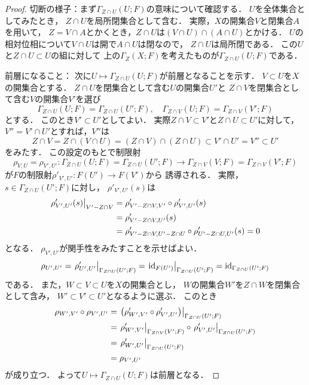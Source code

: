 \begin{proof}
    切断の様子：まず\(\Gamma_{Z\cap U}(U;F)\)の意味について確認する．
    \(U\)を全体集合としてみたとき，
    \(Z\cap U\)を局所閉集合として含む．
    実際，\(X\)の開集合\(V\)と閉集合\(A\)を用いて，
    \(Z=V\cap A\)とかくとき，\(Z\cap U\)は\(
        (V\cap U)\cap (A\cap U)
    \)とかける．
    \(U\)の相対位相について\(V\cap U\)は開で\(A\cap U\)は閉なので，
    \(Z\cap U\)は局所閉である．
    この\(U\)と\(Z\cap U\subset U\)の組に対して
    上の\(\Gamma_Z(X;F)\)を考えたものが\(
        \Gamma_{Z\cap U}(U;F)
    \)である．

    前層になること：
    次に\(U\mapsto\Gamma_{Z\cap U}(U;F)\)が前層となることを示す．
    \(V\subset U\)を\(X\)の開集合とする．
    \(Z\cap U\)を閉集合として含む\(U\)の開集合\(U'\)と
    \(Z\cap V\)を閉集合として含む\(V\)の開集合\(V'\)を選び\[
        \Gamma_{Z\cap U}(U;F)=
        \Gamma_{Z\cap U}(U';F),\quad
        \Gamma_{Z\cap V}(U;F)=
        \Gamma_{Z\cap V}(V';F)
    \]とする．
    このとき\(V'\subset U'\)としてよい．
    実際\(Z\cap V\subset V'\)と\(Z\cap U \subset U'\)に対して，
    \(V''= V'\cap U'\)とすれば，\(V''\)は\[
        Z\cap V=Z\cap (V\cap U)
        =(Z\cap V)\cap (Z\cap U)
        \subset V'\cap U'
        =V''\subset U'
    \]をみたす．
    この設定のもとで制限射\[
        \rho_{V,U}=\rho_{V',U'}\colon
        \Gamma_{Z\cap U}(U;F)
        =\Gamma_{Z\cap U}(U';F)
        \to\Gamma_{Z\cap V}(V;F)
        =\Gamma_{Z\cap V}(V';F)
    \]が\(F\)の制限射\(\rho'_{V',U'}\colon F(U')\to F(V')\)から
    誘導される．
    実際，\(s\in\Gamma_{Z\cap U}(U';F)\)に対し，
    \(\rho'_{V',U'}(s)\)は
    \begin{align*}
        \mres[\rho'_{V',U'}(s)]{V'-Z\cap V}
        &=\rho'_{V'-Z\cap V,V'}\circ \rho'_{V',U'}(s)\\
        &=\rho'_{V'-Z\cap V,U'}(s)\\
        &=\rho'_{V'-Z\cap V,U'-Z\cap U}\circ \rho'_{U'-Z\cap U,U'}(s)=0
    \end{align*}
    となる． \(\rho_{V',U'}\)が関手性をみたすことを示せばよい．
    \[
        \rho_{U',U'}
        =\mres[\rho'_{U',U'}]{\Gamma_{Z\cap U}(U';F)}
        =\mres[\id_{F(U')}]{\Gamma_{Z\cap U}(U';F)}
        =\id_{\Gamma_{Z\cap U}(U';F)}
    \]である．
    また，\(W\subset V\subset U\)を\(X\)の開集合とし，
    \(W\)の開集合\(W'\)を\(Z\cap W\)を閉集合として含み，
    \(W'\subset V'\subset U'\)となるように選ぶ．
    このとき
    \begin{align*}
        \rho_{W',V'}\circ\rho_{V',U'}
        &=\mres[{\left(
            \rho'_{W',V'}\circ\rho'_{V',U'}
        \right)}]{\Gamma_{Z\cap U}(U';F)}\\
        &=\mres[\rho'_{W',V'}]{\Gamma_{Z\cap V}(V';F)}
        \circ\mres[\rho'_{V',U'}]{\Gamma_{Z\cap U}(U';F)}\\
        &=\mres[\rho'_{W',U'}]{\Gamma_{Z\cap U}(U';F)}\\
        &=\rho_{V',U'}
    \end{align*}
    が成り立つ．
    よって\(U\mapsto\Gamma_{Z\cap U}(U;F)\)は前層となる．


\end{proof}

